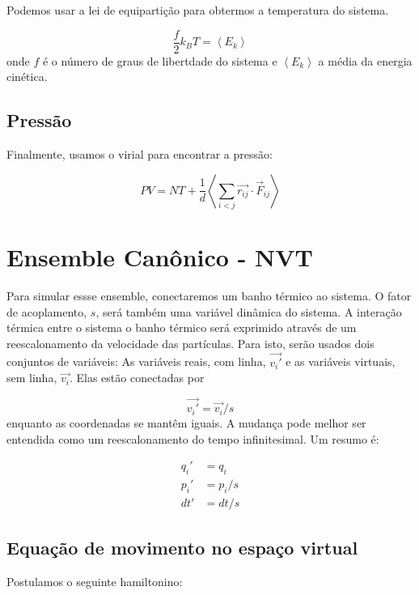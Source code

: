 \documentclass[twoside, a4paper]{scrartcl}
\begin{document}
Podemos usar a lei de equipartição para obtermos a temperatura do sistema. 

\begin{equation}
	\frac{f}{2} k_B T = \left<E_k\right>
\end{equation}
onde $f$ é o número de graus de libertdade do sistema e $\left<E_k\right>$ a média da energia cinética.

\subsection{Pressão}

Finalmente, usamos o virial para encontrar a pressão:

\begin{equation}
	PV = NT + \frac{1}{d} \left<\sum_{i<j} \vec{r_{ij}} \cdot \vec{F}_{ij}\right>
\end{equation}

\section{Ensemble Canônico - NVT}

Para simular essse ensemble, conectaremos um banho térmico ao sistema. O fator de acoplamento, $s$, será também uma variável dinâmica do sistema. A interação térmica entre o sistema o banho térmico será exprimido através de um reescalonamento da velocidade das partículas. Para isto, serão usados dois conjuntos de variáveis: As variáveis reais, com linha, $\vec{v_i'}$ e as variáveis virtuais, sem linha, $\vec{v_i}$. Elas estão conectadas por

\begin{equation}
	\vec{v_i'} = \vec{v_i}/s
\end{equation}
enquanto as coordenadas se mantêm iguais. A mudança pode melhor ser entendida como um reescalonamento do tempo infinitesimal. Um resumo é:

\begin{subequations}
	\begin{align}
		q_i' &= q_i \\
		p_i' &= p_i/s \\
		dt' &= dt/s
	\end{align}
\end{subequations}

\subsection{Equação de movimento no espaço virtual}
Postulamos o seguinte hamiltonino:
\end{document}

